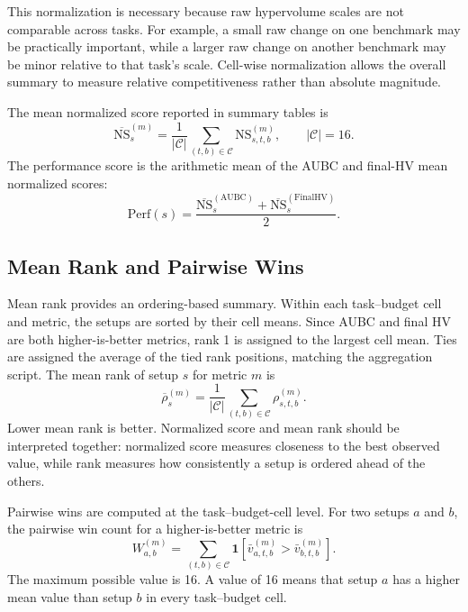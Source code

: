 \documentclass[../main.tex]{subfiles}
\begin{document}
This normalization is necessary because raw hypervolume scales are not comparable across tasks. For example, a small raw change on one benchmark may be practically important, while a larger raw change on another benchmark may be minor relative to that task's scale. Cell-wise normalization allows the overall summary to measure relative competitiveness rather than absolute magnitude.

The mean normalized score reported in summary tables is
\begin{equation}
  \overline{\mathrm{NS}}^{(m)}_{s}
  =
  \frac{1}{|\mathcal{C}|}
  \sum_{(t,b)\in\mathcal{C}}
  \mathrm{NS}^{(m)}_{s,t,b},
  \qquad |\mathcal{C}|=16.
  \label{eq:mean-normalized-score-chapter5}
\end{equation}
The performance score is the arithmetic mean of the AUBC and final-HV mean normalized scores:
\begin{equation}
  \mathrm{Perf}(s)
  =
  \frac{
    \overline{\mathrm{NS}}^{(\mathrm{AUBC})}_{s}
    +
    \overline{\mathrm{NS}}^{(\mathrm{FinalHV})}_{s}
  }{2}.
  \label{eq:performance-score-chapter5}
\end{equation}

\subsection{Mean Rank and Pairwise Wins}

Mean rank provides an ordering-based summary. Within each task--budget cell and metric, the setups are sorted by their cell means. Since AUBC and final HV are both higher-is-better metrics, rank 1 is assigned to the largest cell mean. Ties are assigned the average of the tied rank positions, matching the aggregation script. The mean rank of setup $s$ for metric $m$ is
\begin{equation}
  \overline{\rho}^{(m)}_{s}
  =
  \frac{1}{|\mathcal{C}|}
  \sum_{(t,b)\in\mathcal{C}}
  \rho^{(m)}_{s,t,b}.
  \label{eq:mean-rank-chapter5}
\end{equation}
Lower mean rank is better. Normalized score and mean rank should be interpreted together: normalized score measures closeness to the best observed value, while rank measures how consistently a setup is ordered ahead of the others.

Pairwise wins are computed at the task--budget-cell level. For two setups $a$ and $b$, the pairwise win count for a higher-is-better metric is
\begin{equation}
  W^{(m)}_{a,b}
  =
  \sum_{(t,b)\in\mathcal{C}}
  \mathbf{1}
  \left[
    \bar{v}^{(m)}_{a,t,b}
    >
    \bar{v}^{(m)}_{b,t,b}
  \right].
  \label{eq:pairwise-wins-chapter5}
\end{equation}
The maximum possible value is 16. A value of 16 means that setup $a$ has a higher mean value than setup $b$ in every task--budget cell.
\end{document}
